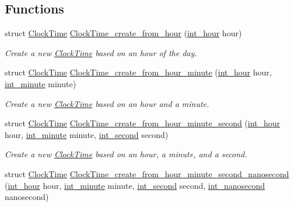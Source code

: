 \subsection*{\-Functions}
\begin{DoxyCompactItemize}
\item 
struct \hyperlink{structClockTime}{\-Clock\-Time} \hyperlink{clock-time_8h_a172dd5f4ae9a67a7d0efe2b7c3e1a7b9}{\-Clock\-Time\-\_\-create\-\_\-from\-\_\-hour} (\hyperlink{types_8h_a62ed583cd6a13da9650111e3b4b4eedc}{int\-\_\-hour} hour)
\begin{DoxyCompactList}\small\item\em \-Create a new \hyperlink{structClockTime}{\-Clock\-Time} based on an hour of the day. \end{DoxyCompactList}\item 
struct \hyperlink{structClockTime}{\-Clock\-Time} \hyperlink{clock-time_8h_ab1d019479c07792ba3789d4611bf47bd}{\-Clock\-Time\-\_\-create\-\_\-from\-\_\-hour\-\_\-minute} (\hyperlink{types_8h_a62ed583cd6a13da9650111e3b4b4eedc}{int\-\_\-hour} hour, \hyperlink{types_8h_a3e55debfc84cabacf28bddf2d04984c9}{int\-\_\-minute} minute)
\begin{DoxyCompactList}\small\item\em \-Create a new \hyperlink{structClockTime}{\-Clock\-Time} based on an hour and a minute. \end{DoxyCompactList}\item 
struct \hyperlink{structClockTime}{\-Clock\-Time} \hyperlink{clock-time_8h_a1015eecfae508e22c54a4f1b52634fbf}{\-Clock\-Time\-\_\-create\-\_\-from\-\_\-hour\-\_\-minute\-\_\-second} (\hyperlink{types_8h_a62ed583cd6a13da9650111e3b4b4eedc}{int\-\_\-hour} hour, \hyperlink{types_8h_a3e55debfc84cabacf28bddf2d04984c9}{int\-\_\-minute} minute, \hyperlink{types_8h_abd3494f4b69b446ec1fc0477a8b769c9}{int\-\_\-second} second)
\begin{DoxyCompactList}\small\item\em \-Create a new \hyperlink{structClockTime}{\-Clock\-Time} based on an hour, a minute, and a second. \end{DoxyCompactList}\item 
struct \hyperlink{structClockTime}{\-Clock\-Time} \hyperlink{clock-time_8h_acc3b0e5400f78e25499a815f4068739e}{\-Clock\-Time\-\_\-create\-\_\-from\-\_\-hour\-\_\-minute\-\_\-second\-\_\-nanosecond} (\hyperlink{types_8h_a62ed583cd6a13da9650111e3b4b4eedc}{int\-\_\-hour} hour, \hyperlink{types_8h_a3e55debfc84cabacf28bddf2d04984c9}{int\-\_\-minute} minute, \hyperlink{types_8h_abd3494f4b69b446ec1fc0477a8b769c9}{int\-\_\-second} second, \hyperlink{types_8h_a153ef9bf3a8448179ab1d606f5593b4c}{int\-\_\-nanosecond} nanosecond)

\end{DoxyCompactItemize}
